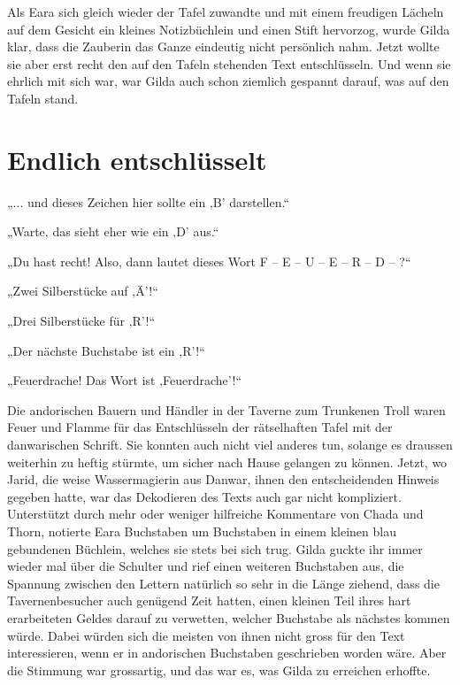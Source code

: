 Als Eara sich gleich wieder der Tafel zuwandte und mit einem freudigen Lächeln auf dem Gesicht ein kleines Notizbüchlein und einen Stift hervorzog, wurde Gilda klar, dass die Zauberin das Ganze eindeutig nicht persönlich nahm. Jetzt wollte sie aber erst recht den auf den Tafeln stehenden Text entschlüsseln. Und wenn sie ehrlich mit sich war, war Gilda auch schon ziemlich gespannt darauf, was auf den Tafeln stand.








\newpage
\section{Endlich entschlüsselt}



„... und dieses Zeichen hier sollte ein ‚B’ darstellen.“

„Warte, das sieht eher wie ein ‚D’ aus.“

„Du hast recht! Also, dann lautet dieses Wort F – E – U – E – R – D – ?“

„Zwei Silberstücke auf ‚Ä’!“

„Drei Silberstücke für ‚R’!“

„Der nächste Buchstabe ist ein ‚R’!“

„Feuerdrache! Das Wort ist ‚Feuerdrache’!“\bigskip



Die andorischen Bauern und Händler in der Taverne zum Trunkenen Troll waren Feuer und Flamme für das Entschlüsseln der rätselhaften Tafel mit der danwarischen Schrift. Sie konnten auch nicht viel anderes tun, solange es draussen weiterhin zu heftig stürmte, um sicher nach Hause gelangen zu können. Jetzt, wo Jarid, die weise Wassermagierin aus Danwar, ihnen den entscheidenden Hinweis gegeben hatte, war das Dekodieren des Texts auch gar nicht kompliziert. Unterstützt durch mehr oder weniger hilfreiche Kommentare von Chada und Thorn, notierte Eara Buchstaben um Buchstaben in einem kleinen blau gebundenen Büchlein, welches sie stets bei sich trug. Gilda guckte ihr immer wieder mal über die Schulter und rief einen weiteren Buchstaben aus, die Spannung zwischen den Lettern natürlich so sehr in die Länge ziehend, dass die Tavernenbesucher auch genügend Zeit hatten, einen kleinen Teil ihres hart erarbeiteten Geldes darauf zu verwetten, welcher Buchstabe als nächstes kommen würde. Dabei würden sich die meisten von ihnen nicht gross für den Text interessieren, wenn er in andorischen Buchstaben geschrieben worden wäre. Aber die Stimmung war grossartig, und das war es, was Gilda zu erreichen erhoffte.\bigskip



